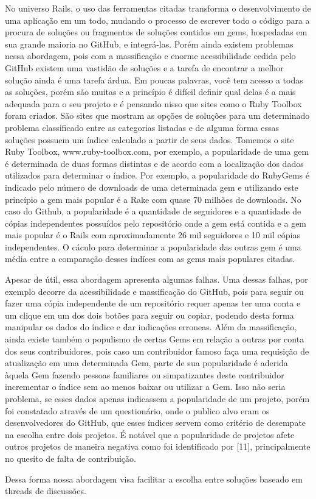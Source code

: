 No universo Rails, o uso das ferramentas citadas transforma o desenvolvimento de uma aplicação em um todo, mudando o processo de escrever todo o código para a procura de soluções ou fragmentos de soluções contidos em gems, hospedadas em sua grande maioria no GitHub, e integrá-las. Porém ainda existem problemas nessa abordagem, pois com a massificação e enorme acessibilidade cedida pelo GitHub existem uma vastidão de soluções e a tarefa de encontrar a melhor solução ainda é uma tarefa árdua. Em poucas palavras, você tem acesso a todas as soluções, porém são muitas e a princípio é difícil definir qual delas é a mais adequada para o seu projeto e é pensando nisso que sites como o Ruby Toolbox foram criados. São sites que mostram as opções de soluções para um determinado problema classificado entre as categorias listadas e de alguma forma essas soluções possuem um índice calculado a partir de seus dados. Tomemos o site Ruby Toolbox, www.ruby-toolbox.com, por exemplo, a popularidade de uma gem é determinada de duas formas distintas e de acordo com a localização dos dados utilizados para determinar o índice. Por exemplo, a popularidade do RubyGems é indicado pelo número de downloads de uma determinada gem e utilizando este princípio a gem mais popular é a Rake com quase 70 milhões de downloads. No caso do Github, a popularidade é a quantidade de seguidores e a quantidade de cópias independentes possuídos pelo repositório onde a gem está contida e a gem mais popular é o Rails com aproximadamente 26 mil seguidores e 10 mil cópias independentes. O cáculo para determinar a popularidade das outras gem é uma média entre a comparação desses indíces com as gems mais populares citadas.

Apesar de útil, essa abordagem apresenta algumas falhas. Uma dessas falhas, por exemplo decorre da acessibilidade e massificação do GitHub, pois para seguir ou fazer uma cópia independente de um repositório requer apenas ter uma conta e um clique em um dos dois botões para seguir ou copiar, podendo desta forma manipular os dados do índice e dar indicações erroneas. Além da massificação, ainda existe também o populismo de certas Gems em relação a outras por conta dos seus contribuidores, pois caso um contribuidor famoso faça uma requisição de atualização em uma determinada Gem, parte de sua popularidade é aderida àquela Gem fazendo pessoas familiares ou simpatizantes deste contribuidor incrementar o índice sem ao menos baixar ou utilizar a Gem. Isso não seria problema, se esses dados apenas indicassem a popularidade de um projeto, porém foi constatado através de um questionário, onde o publico alvo eram os desenvolvedores do GitHub, que esses índices servem como critério de desempate na escolha entre dois projetos. É notável que a popularidade de projetos afete outros projetos de maneira negativa como foi identificado por [11], principalmente no quesito de falta de contribuição. 

Dessa forma nossa abordagem visa facilitar a escolha entre soluções baseado em threads de discussões.